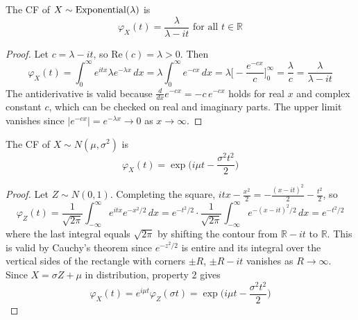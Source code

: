 	\begin{theorem}
	  \label{thm:cf-of-exponential-distribution}
		The CF of \hyperref[def:exponential-random-variable]{$X \sim \operatorname{Exponential}(\lambda)$} is 
		\begin{equation}
			\varphi_X (t) = \frac{\lambda}{\lambda - i t} \text{ for all } t \in \mathbb{R}
		\end{equation}
	\end{theorem}
	\begin{proof}
		Let $c = \lambda - i t$, so $\mathrm{Re}(c) = \lambda > 0$. Then 
		\begin{equation}
			\varphi_X (t) = \int_0^\infty e^{i t x} \lambda e^{-\lambda x} \,dx = \lambda \int_0^\infty e^{-c x} \,dx = \lambda \bigg[ -\frac{e^{-c x}}{c} \bigg]_0^\infty = \frac{\lambda}{c} = \frac{\lambda}{\lambda - i t}
		\end{equation}
		The antiderivative is valid because $\frac{d}{dx} e^{-c x} = -c \, e^{-c x}$ holds for real $x$ and complex constant $c$, which can be checked on real and imaginary parts. The upper limit vanishes since $|e^{-c x}| = e^{-\lambda x} \to 0$ as $x \to \infty$. 
	\end{proof}

	\begin{theorem}
		\label{thm:cf-of-gaussian-distribution}
	  The CF of $X \sim N(\mu, \sigma^2)$ is 
		\begin{equation}
		  \varphi_X (t) = \exp \bigg( i \mu t - \frac{\sigma^2 t^2}{2} \bigg)
		\end{equation}
	\end{theorem}
	\begin{proof}
	  Let $Z \sim N(0, 1)$. Completing the square, $i t x - \frac{x^2}{2} = -\frac{(x - i t)^2}{2} - \frac{t^2}{2}$, so 
		\begin{equation}
			\varphi_Z (t) = \frac{1}{\sqrt{2\pi}} \int_{-\infty}^\infty e^{i t x} e^{-x^2/2} \,dx = e^{-t^2/2} \cdot \frac{1}{\sqrt{2\pi}} \int_{-\infty}^\infty e^{-(x - i t)^2/2} \,dx = e^{-t^2/2}
		\end{equation}
		where the last integral equals $\sqrt{2\pi}$ by shifting the contour from $\mathbb{R} - it$ to $\mathbb{R}$. This is valid by Cauchy's theorem since $e^{-z^2/2}$ is entire and its integral over the vertical sides of the rectangle with corners $\pm R$, $\pm R - it$ vanishes as $R \to \infty$. Since $X = \sigma Z + \mu$ in distribution, property 2 gives 
		\begin{equation}
			\varphi_X (t) = e^{i \mu t} \varphi_Z (\sigma t) = \exp \bigg( i \mu t - \frac{\sigma^2 t^2}{2} \bigg)
		\end{equation}
	\end{proof}

